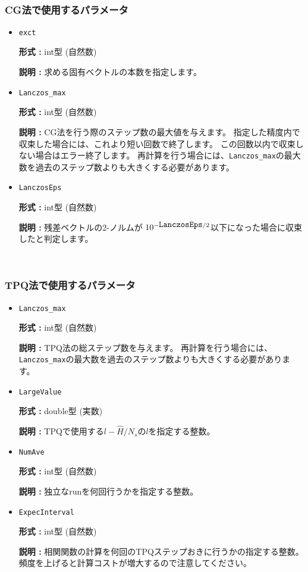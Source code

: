 ~\subsubsection{CG法で使用するパラメータ}

\begin{itemize}
 \item  \verb|exct|

{\bf 形式 :} int型 (自然数)

{\bf 説明 :} 求める固有ベクトルの本数を指定します。

\item  \verb|Lanczos_max|

{\bf 形式 :} int型 (自然数)

{\bf 説明 :}  CG法を行う際のステップ数の最大値を与えます。
指定した精度内で収束した場合には、これより短い回数で終了します。
この回数以内で収束しない場合はエラー終了します。
再計算を行う場合には、\verb|Lanczos_max|の最大数を過去のステップ数よりも大きくする必要があります。

\item   \verb|LanczosEps|
   
{\bf 形式 :} int型 (自然数)

{\bf 説明 :} 残差ベクトルの2-ノルムが
$10^{- \verb|LanczosEps|/2}$以下になった場合に収束したと判定します。
\end{itemize}

~\subsubsection{TPQ法で使用するパラメータ}
\begin{itemize}     
 \item  \verb|Lanczos_max|

{\bf 形式 :} int型 (自然数)

{\bf 説明 :}  TPQ法の総ステップ数を与えます。
再計算を行う場合には、\verb|Lanczos_max|の最大数を過去のステップ数よりも大きくする必要があります。
     
\item \verb|LargeValue|

{\bf 形式 :} double型 (実数)

{\bf 説明 :} TPQで使用する$l-\hat{H}/N_{s}$の$l$を指定する整数。
 
\item \verb|NumAve|

{\bf 形式 :} int型 (自然数)

{\bf 説明 :} 独立なrunを何回行うかを指定する整数。

\item \verb|ExpecInterval|

{\bf 形式 :} int型 (自然数)

{\bf 説明 :} 相関関数の計算を何回のTPQステップおきに行うかの指定する整数。
頻度を上げると計算コストが増大するので注意してください。
\end{itemize}    

